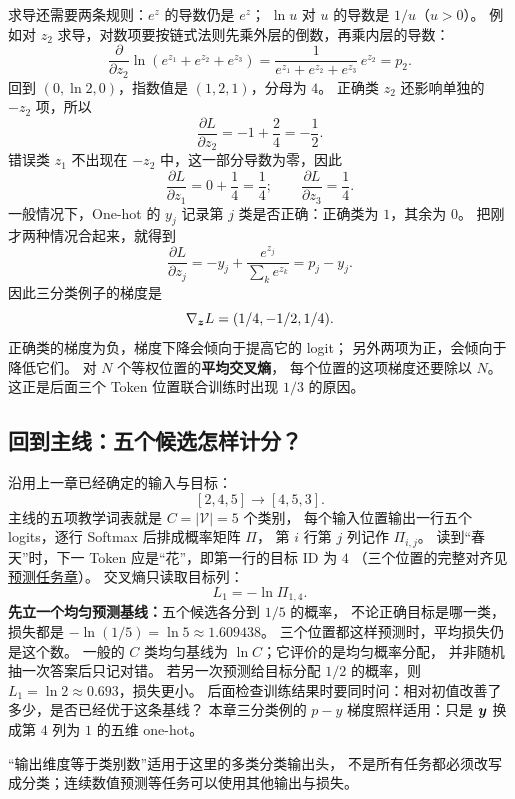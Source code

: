 求导还需要两条规则：$e^z$ 的导数仍是 $e^z$；
$\ln u$ 对 $u$ 的导数是 $1/u$（$u>0$）。
例如对 $z_2$ 求导，对数项要按链式法则先乘外层的倒数，再乘内层的导数：
\[
\frac{\partial}{\partial z_2}\ln(e^{z_1}+e^{z_2}+e^{z_3})
=\frac{1}{e^{z_1}+e^{z_2}+e^{z_3}}\,e^{z_2}=p_2.
\]
回到 $(0,\ln2,0)$，指数值是 $(1,2,1)$，分母为 $4$。
正确类 $z_2$ 还影响单独的 $-z_2$ 项，所以
\[
\frac{\partial L}{\partial z_2}=-1+\frac24=-\frac12.
\]
错误类 $z_1$ 不出现在 $-z_2$ 中，这一部分导数为零，因此
\[
\frac{\partial L}{\partial z_1}=0+\frac14=\frac14;
\qquad \frac{\partial L}{\partial z_3}=\frac14.
\]
一般情况下，One-hot 的 $y_j$ 记录第 $j$ 类是否正确：正确类为 $1$，其余为 $0$。
把刚才两种情况合起来，就得到
\[
\frac{\partial L}{\partial z_j}
=-y_j+\frac{e^{z_j}}{\sum_k e^{z_k}}
=\boxed{p_j-y_j}.
\]
因此三分类例子的梯度是
\[
\nabla_{\boldsymbol{z}}L=(1/4,-1/2,1/4).
\]
正确类的梯度为负，梯度下降会倾向于提高它的 logit；
另外两项为正，会倾向于降低它们。
对 $N$ 个等权位置的\textbf{平均交叉熵}，
每个位置的这项梯度还要除以 $N$。
这正是后面三个 Token 位置联合训练时出现 $1/3$ 的原因。

\subsection{回到主线：五个候选怎样计分？}

沿用上一章已经确定的输入与目标：
\[
[2,4,5]\longrightarrow[4,5,3].
\]
主线的五项教学词表就是 $C=|\mathcal V|=5$ 个类别，
每个输入位置输出一行五个 logits，逐行 Softmax 后排成概率矩阵 $\Pi$，
第 $i$ 行第 $j$ 列记作 $\Pi_{i,j}$。
读到“春天”时，下一 Token 应是“花”，即第一行的目标 ID 为 $4$
（三个位置的完整对齐见\hyperref[intro:language-model-task]{预测任务章}）。
交叉熵只读取目标列：
\[
L_1=-\ln\Pi_{1,4}.
\]
\label{concept:uniform-baseline}%
\textbf{先立一个均匀预测基线：}五个候选各分到 $1/5$ 的概率，
不论正确目标是哪一类，损失都是 $-\ln(1/5)=\ln5\approx1.609438$。
三个位置都这样预测时，平均损失仍是这个数。
一般的 $C$ 类均匀基线为 $\ln C$；它评价的是均匀概率分配，
并非随机抽一次答案后只记对错。
若另一次预测给目标分配 $1/2$ 的概率，则 $L_1=\ln2\approx0.693$，损失更小。
后面检查训练结果时要同时问：相对初值改善了多少，是否已经优于这条基线？
本章三分类例的 $p-y$ 梯度照样适用：只是 $\boldsymbol{y}$ 换成第 $4$ 列为 $1$ 的五维 one-hot。

\begin{warningbox}
“输出维度等于类别数”适用于这里的多类分类输出头，
不是所有任务都必须改写成分类；连续数值预测等任务可以使用其他输出与损失。
\end{warningbox}

